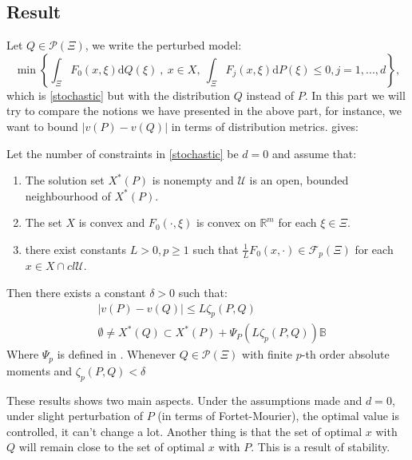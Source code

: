 \documentclass{amsart}
\newcommand{\RR}{\mathbb{R}}
\begin{document}
\subsection{Result}
Let $Q\in\mathcal{P}\left(\Xi\right)$, we write the perturbed model:
\begin{equation*}
    \min\left\{\int_\Xi F_0\left(x,\xi\right)\text{d}Q\left(\xi\right)\:,\: x\in X, \: \int_\Xi F_j\left(x,\xi\right)\text{d}P\left(\xi\right)\leq0, j=1,...,d\right\},
\end{equation*}
which is \eqref{stochastic} but with the distribution $Q$ instead of $P$. In this part we will try to compare the notions we have presented in the above part, for instance, we want to bound $\lvert v\left(P\right)-v\left(Q\right)\rvert$ in terms of distribution metrics. \cite[Corollary 14]{romisch_stability_2003} gives:
\begin{theorem}\label{stability_th}
    Let the number of constraints in \eqref{stochastic} be $d=0$ and assume that:
    \begin{enumerate}
        \item The  solution set $X^*\left(P\right)$ is nonempty and $\mathcal{U}$ is an open, bounded neighbourhood of $X^*\left(P\right)$.
        \item The set $X$ is convex and $F_0\left(\cdot,\xi\right)$ is convex on $\RR^m$ for each $\xi\in\Xi$.
        \item there exist constants $L>0, p\geq1$ such that $\frac{1}{L}F_0\left(x,\cdot \right)\in\mathcal{F}_p\left(\Xi\right)$ for each $x\in X\cap cl\mathcal{U}$. 
    \end{enumerate}
    Then there exists a constant $\delta>0$ such that:
    \begin{align*}
        &\lvert v\left(P\right)-v\left(Q\right)\rvert \leq L\zeta_p\left(P,Q\right) \\
        & \emptyset \ne X^*\left(Q\right)\subset X^*\left(P\right)+\Psi_P\left(L\zeta_p\left(P,Q\right)\right)\mathbb{B}
    \end{align*}
    Where $\Psi_p$ is defined in \cite[2.22-2.23]{romisch_stability_2003}. Whenever $Q\in\mathcal{P}\left(\Xi\right)$ with finite $p$-th order absolute moments and $\zeta_p\left(P,Q\right)<\delta$
\end{theorem}
These results shows two main aspects. Under the assumptions made and $d=0$, under slight perturbation of $P$ (in terms of Fortet-Mourier), the optimal value is controlled, it can't change a lot. Another thing is that the set of optimal $x$ with $Q$ will remain close to the set of optimal $x$ with $P$. This is a result of stability. 
\end{document}
